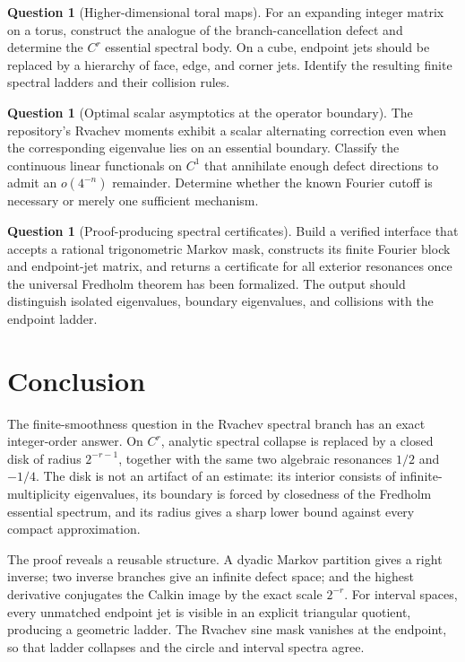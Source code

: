 \documentclass[11pt,a4paper]{article}
\theoremstyle{definition}
\newtheorem{question}[theorem]{Question}
\theoremstyle{remark}
\begin{document}
\begin{question}[Higher-dimensional toral maps]
For an expanding integer matrix on a torus, construct the analogue of the
branch-cancellation defect and determine the $C^r$ essential spectral body.
On a cube, endpoint jets should be replaced by a hierarchy of face, edge, and
corner jets.  Identify the resulting finite spectral ladders and their
collision rules.
\end{question}

\begin{question}[Optimal scalar asymptotics at the operator boundary]
The repository's Rvachev moments exhibit a scalar alternating correction even
when the corresponding eigenvalue lies on an essential boundary.  Classify
the continuous linear functionals on $C^1$ that annihilate enough defect
directions to admit an $o(4^{-n})$ remainder.  Determine whether the known
Fourier cutoff is necessary or merely one sufficient mechanism.
\end{question}

\begin{question}[Proof-producing spectral certificates]
Build a verified interface that accepts a rational trigonometric Markov mask,
constructs its finite Fourier block and endpoint-jet matrix, and returns a
certificate for all exterior resonances once the universal Fredholm theorem
has been formalized.  The output should distinguish isolated eigenvalues,
boundary eigenvalues, and collisions with the endpoint ladder.
\end{question}

\section{Conclusion}
The finite-smoothness question in the Rvachev spectral branch has an exact
integer-order answer.  On $C^r$, analytic spectral collapse is replaced by a
closed disk of radius $2^{-r-1}$, together with the same two algebraic
resonances $1/2$ and $-1/4$.  The disk is not an artifact of an estimate: its
interior consists of infinite-multiplicity eigenvalues, its boundary is forced
by closedness of the Fredholm essential spectrum, and its radius gives a
sharp lower bound against every compact approximation.

The proof reveals a reusable structure.  A dyadic Markov partition gives a
right inverse; two inverse branches give an infinite defect space; and the
highest derivative conjugates the Calkin image by the exact scale $2^{-r}$.
For interval spaces, every unmatched endpoint jet is visible in an explicit
triangular quotient, producing a geometric ladder.  The Rvachev sine mask
vanishes at the endpoint, so that ladder collapses and the circle and interval
spectra agree.
\end{document}
